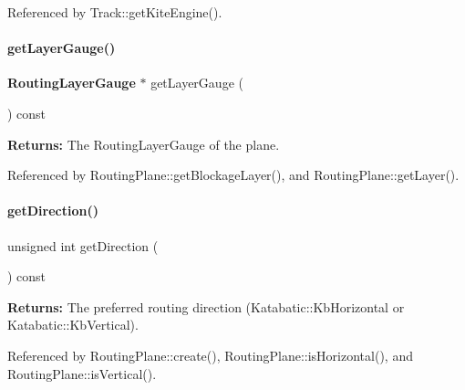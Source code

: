 Referenced by Track\+::get\+Kite\+Engine().

\mbox{\label{classKite_1_1RoutingPlane_ae0b0e4f62672b952af5ba448e7fe4810}} 
\paragraph{\texorpdfstring{get\+Layer\+Gauge()}{getLayerGauge()}}
{\footnotesize\ttfamily \textbf{ Routing\+Layer\+Gauge} $\ast$ get\+Layer\+Gauge (\begin{DoxyParamCaption}{ }\end{DoxyParamCaption}) const\hspace{0.3cm}{\ttfamily [inline]}}

{\bfseries Returns\+:} The Routing\+Layer\+Gauge of the plane. 

Referenced by Routing\+Plane\+::get\+Blockage\+Layer(), and Routing\+Plane\+::get\+Layer().

\mbox{\label{classKite_1_1RoutingPlane_a0dd7cf705ace42c662c289955313b2e9}} 
\paragraph{\texorpdfstring{get\+Direction()}{getDirection()}}
{\footnotesize\ttfamily unsigned int get\+Direction (\begin{DoxyParamCaption}{ }\end{DoxyParamCaption}) const\hspace{0.3cm}{\ttfamily [inline]}}

{\bfseries Returns\+:} The preferred routing direction (Katabatic\+::\+Kb\+Horizontal or Katabatic\+::\+Kb\+Vertical). 

Referenced by Routing\+Plane\+::create(), Routing\+Plane\+::is\+Horizontal(), and Routing\+Plane\+::is\+Vertical().

\mbox{\label{classKite_1_1RoutingPlane_a1c9c37c39d0eb83b0b4279e3e54e24a5}} 
